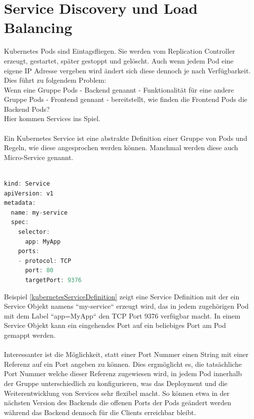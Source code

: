 \section{Service Discovery und Load Balancing}
Kubernetes Pods sind Eintagsfliegen. Sie werden vom Replication Controller erzeugt, gestartet, später gestoppt und gelöscht. Auch wenn jedem Pod eine eigene IP Adresse vergeben wird ändert sich diese dennoch je nach Verfügbarkeit. 
Dies führt zu folgendem Problem:\\
Wenn eine Gruppe Pods - Backend genannt - Funktionalität für eine andere Gruppe Pods - Frontend gennant - bereitstellt, wie finden die Frontend Pods die Backend Pods?\\
Hier kommen Services ins Spiel.\\\\
Ein Kubernetes Service ist eine abstrakte Definition einer Gruppe von Pods und Regeln, wie diese angesprochen werden können. Manchmal werden diese auch Micro-Service genannt.\\\\
\begin{minipage}{\linewidth}
\begin{lstlisting}[frame=single,caption=Kubernetes Service Definition, label=kubernetesServiceDefinition, language=Scala]
kind: Service
apiVersion: v1
metadata:
  name: my-service
  spec:
    selector:
      app: MyApp
    ports:
    - protocol: TCP
      port: 80
      targetPort: 9376
\end{lstlisting}
\end{minipage}
Beispiel \ref{kubernetesServiceDefinition} zeigt eine Service Definition mit der ein Service Objekt namens ``my-service`` erzeugt wird, das in jedem zugehörigen Pod mit dem Label ``app=MyApp`` den TCP Port 9376 verfügbar macht.
In einem Service Objekt kann ein eingehendes Port auf ein beliebiges Port am Pod gemappt werden.\\\\
Interessanter ist die Möglichkeit, statt einer Port Nummer einen String mit einer Referenz auf ein Port angeben zu können. Dies ergmöglicht es, die tatsächliche Port Nummer welche dieser Referenz zugewiesen wird, in jedem Pod innerhalb der Gruppe unterschiedlich zu konfigurieren, was das Deployment und die Weiterentwicklung von Services sehr flexibel macht. So können etwa in der nächsten Version des Backends die offenen Ports der Pods geändert werden während das Backend dennoch für die Clients erreichbar bleibt.
\\\\
